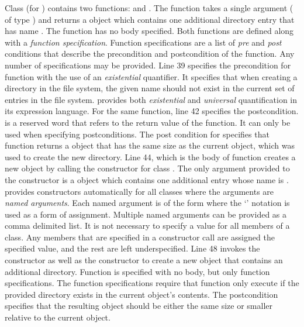 Class  (for ) contains two functions:
 and . The  function takes a
single argument ( of type ) and returns a
 object which contains one additional directory entry that
has name . The  function has no body
specified. Both functions are defined along with a {\em function
  specification}. Function specifications are a list of {\em pre} and
{\em post} conditions that describe the precondition and postcondition
of the function. Any number of specifications may be provided. Line 39
specifies the precondition for function  with the use of
an {\em existential} quantifier. It specifies that when creating a
directory in the file system, the given name  should not exist
in the current set of entries in the file system. \Klang{} provides
both {\em existential} and {\em universal} quantification in its
expression language. For the same function, line 42 specifies the
postcondition.  is a reserved word that refers to the
return value of the function. It can only be used when specifying
postconditions. The post condition for  specifies that
function  returns a  object that has the same
size as the current  object, which was used to create the new
directory. Line 44, which is the body of function  creates
a new  object by calling the constructor for class
. The only argument provided to the constructor is a
 object which contains one additional  entry whose
name is . \Klang{} provides constructors automatically for all
classes where the arguments are {\em named arguments}. Each named
argument is of the form  where the `\code{::}'
notation is used as a form of assignment. Multiple named arguments can
be provided as a comma delimited list. It is not necessary to specify
a value for all members of a class. Any members that are specified in
a constructor call are assigned the specified value, and the rest are
left underspecified.  Line 48 invokes the  constructor as
well as the  constructor to create a new  object
that contains an additional directory. Function  is
specified with no body, but only function specifications. The function
specifications require that function  only execute if the
provided directory  exists in the current object's
contents. The postcondition specifies that the resulting 
object should be either the same size or smaller relative to the
current object.

